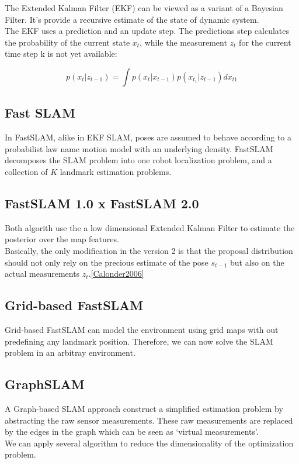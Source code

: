 \documentclass[10pt,journal,compsoc]{IEEEtran}
\begin{document}
The Extended Kalman Filter (EKF) can be viewed as a variant of a Bayesian Filter. It's provide a recursive estimate of
the state of dynamic system.\\
The EKF uses a prediction and an update step. The predictions step calculates the probability of the current state
$x_t$, while the measurement $z_t$ for the current time step k is not yet available:

\begin{equation}

  p(x_t|z_{t-1}) = \int p(x_t| x_{t-1}) p(x_{t_1}|z_{t-1}) dx_{t1}

\end{equation}

\subsection{Fast SLAM}

In FastSLAM, alike in EKF SLAM, poses are assumed to behave according to a probabilist law name motion model with an
underlying density. FastSLAM decomposes the SLAM problem into one robot localization problem, and a collection of $K$
landmark estimation problems.

\subsection{FastSLAM 1.0 x FastSLAM 2.0}

Both algorith use the a low dimensional Extended Kalman Filter to estimate the posterior over the map features.\\
Basically, the only modification in the version 2 is that the proposal distribution should not only rely on the precious
estimate of the pose $s_{t-1}$ but also on the actual measurements $z_t$.\ref{Calonder2006}

\subsection{Grid-based FastSLAM}
Grid-based FastSLAM can model the environment using grid maps with out predefining any landmark position. Therefore, we
can now solve the SLAM problem in an arbitray environment.

\subsection{GraphSLAM}

A Graph-based SLAM approach construct a simplified estimation problem by abstracting the raw sensor measurements. These
raw measurements are replaced by the edges in the graph which can be seen as `virtual measurements'.\\
We can apply several algorithm to reduce the dimensionality of the optimization problem.\cite{Thrun2006a}
\end{document}
